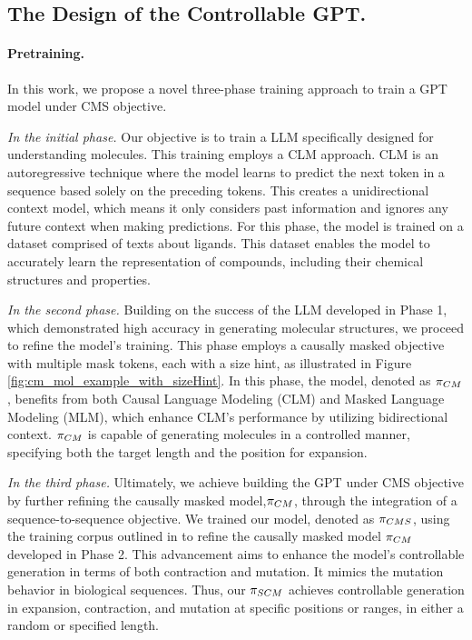 \subsection{The Design of the Controllable GPT.}


\paragraph{Pretraining.}
In this work, 
we propose a novel three-phase training approach to train a GPT model under CMS objective.

\textit{In the initial phase.} Our objective is to train a LLM specifically designed for understanding molecules. This training employs a CLM approach. CLM is an autoregressive technique where the model learns to predict the next token in a sequence based solely on the preceding tokens. This creates a unidirectional context model, which means it only considers past information and ignores any future context when making predictions. For this phase, the model is trained on a dataset comprised of texts about ligands. This dataset enables the model to accurately learn the representation of compounds, including their chemical structures and properties.

\textit{In the second phase.} 
Building on the success of the LLM developed in Phase 1, which demonstrated high accuracy in generating molecular structures, we proceed to refine the model’s training. This phase employs a causally masked objective with multiple mask tokens, each with a size hint, as illustrated in Figure \ref{fig:cm_mol_example_with_sizeHint}.
In this phase, the model, denoted as $\pi_{CM}$, benefits from both Causal Language Modeling (CLM) and Masked Language Modeling (MLM), which enhance CLM's performance by utilizing bidirectional context. $\pi_{CM}$ is capable of generating molecules in a controlled manner, specifying both the target length and the position for expansion.






\textit{In the third phase.} 
Ultimately, we achieve building the GPT under CMS objective by further refining the causally masked model,$\pi_{CM}$, through the integration of a sequence-to-sequence objective. We trained our model, denoted as $\pi_{CMS}$, using the training corpus outlined in  to refine the causally masked model $\pi_{CM}$ developed in Phase 2.
This advancement aims to enhance the model's controllable generation in terms of both contraction and mutation. It mimics the mutation behavior in biological sequences. Thus, our $\pi_{SCM}$ achieves controllable generation in expansion, contraction, and mutation at specific positions or ranges, in either a random or specified length.



